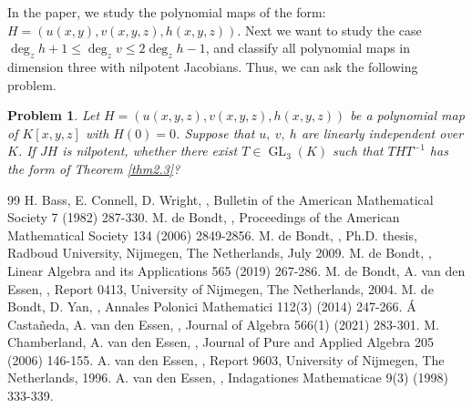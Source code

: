 \documentclass[12pt, twoside, leqno]{article}
\newtheorem{prob}[thm]{Problem}
\theoremstyle{definition}
\numberwithin{equation}{section}
\begin{document}
In the paper, we study the polynomial maps of the form: $H=(u(x,y),v(x,y,z),\allowbreak h(x,y,z))$. Next we want to study the case $\deg_zh+1\leq\deg_zv\leq 2\deg_zh-1$, and classify all polynomial maps in dimension three with nilpotent Jacobians. Thus, we can ask the following problem.

\begin{prob}\label{prob4.1}
Let $H=(u(x,y,z),v(x,y,z),h(x,y,z))$ be a polynomial map of $K[x,y,z]$ with $H(0)= 0$. Suppose that $u,~v,~h$ are linearly independent over $K$. If $JH$ is nilpotent, whether there exist $T\in \operatorname{GL}_3(K)$ such that $THT^{-1}$ has the form of Theorem \ref{thm2.3}?
\end{prob}




\begin{thebibliography}{99}
 H. Bass, E. Connell, D. Wright, , Bulletin of the American Mathematical Society 7 (1982) 287-330.
 M. de Bondt, , Proceedings of the American Mathematical Society 134 (2006) 2849-2856.
 M. de Bondt, , Ph.D. thesis, Radboud University, Nijmegen, The Netherlands, July 2009.
 M. de Bondt, , Linear Algebra and its Applications 565 (2019) 267-286.
 M. de Bondt, A. van den Essen, , Report 0413, University of Nijmegen, The Netherlands, 2004.
 M. de Bondt, D. Yan, , Annales Polonici Mathematici 112(3) (2014) 247-266.
 \'{A} Casta\~{n}eda, A. van den Essen, , Journal of Algebra 566(1) (2021) 283-301.
 M. Chamberland, A. van den Essen, , Journal of Pure and Applied Algebra 205 (2006) 146-155.
 A. van den Essen, , Report 9603, University of Nijmegen, The Netherlands, 1996.
 A. van den Essen, , Indagationes Mathematicae 9(3) (1998) 333-339.

\end{thebibliography}
\end{document}
